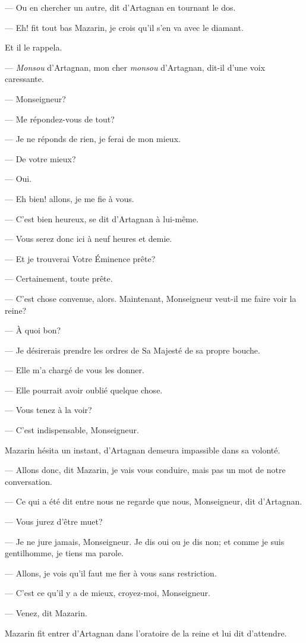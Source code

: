 — Ou en chercher un autre, dit d'Artagnan en tournant le dos.

— Eh! fit tout bas Mazarin, je crois qu'il s'en va avec le diamant.

Et il le rappela.

— \textit{Monsou} d'Artagnan, mon cher \textit{monsou} d'Artagnan, dit-il d'une voix caressante.

— Monseigneur?

— Me répondez-vous de tout?

— Je ne réponds de rien, je ferai de mon mieux.

— De votre mieux?

— Oui.

— Eh bien! allons, je me fie à vous.

— C'est bien heureux, se dit d'Artagnan à lui-même.

— Vous serez donc ici à neuf heures et demie.

— Et je trouverai Votre Éminence prête?

— Certainement, toute prête.

— C'est chose convenue, alors. Maintenant, Monseigneur veut-il me faire voir la reine?

— À quoi bon?

— Je désirerais prendre les ordres de Sa Majesté de sa propre bouche.

— Elle m'a chargé de vous les donner.

— Elle pourrait avoir oublié quelque chose.

— Vous tenez à la voir?

— C'est indispensable, Monseigneur.

Mazarin hésita un instant, d'Artagnan demeura impassible dans sa volonté.

— Allons donc, dit Mazarin, je vais vous conduire, mais pas un mot de notre conversation.

— Ce qui a été dit entre nous ne regarde que nous, Monseigneur, dit d'Artagnan.

— Vous jurez d'être muet?

— Je ne jure jamais, Monseigneur. Je dis oui ou je dis non; et comme je suis gentilhomme, je tiens ma parole.

— Allons, je vois qu'il faut me fier à vous sans restriction.

— C'est ce qu'il y a de mieux, croyez-moi, Monseigneur.

— Venez, dit Mazarin.

Mazarin fit entrer d'Artagnan dans l'oratoire de la reine et lui dit d'attendre.

